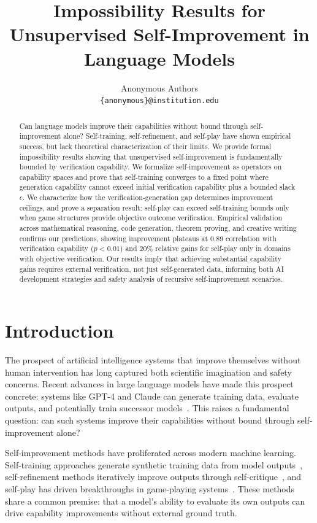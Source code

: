\documentclass{article}
\title{Impossibility Results for Unsupervised Self-Improvement in Language Models}
\author{Anonymous Authors \\
  \texttt{\{anonymous\}@institution.edu}
}
\theoremstyle{definition}
\theoremstyle{remark}
\begin{document}
\maketitle

\begin{abstract}
Can language models improve their capabilities without bound through self-improvement alone? Self-training, self-refinement, and self-play have shown empirical success, but lack theoretical characterization of their limits. We provide formal impossibility results showing that unsupervised self-improvement is fundamentally bounded by verification capability. We formalize self-improvement as operators on capability spaces and prove that self-training converges to a fixed point where generation capability cannot exceed initial verification capability plus a bounded slack \(\epsilon\). We characterize how the verification-generation gap determines improvement ceilings, and prove a separation result: self-play can exceed self-training bounds only when game structures provide objective outcome verification. Empirical validation across mathematical reasoning, code generation, theorem proving, and creative writing confirms our predictions, showing improvement plateaus at \(0.89\) correlation with verification capability (\(p < 0.01\)) and \(20\%\) relative gains for self-play only in domains with objective verification. Our results imply that achieving substantial capability gains requires external verification, not just self-generated data, informing both AI development strategies and safety analysis of recursive self-improvement scenarios.
\end{abstract}

\section{Introduction}
\label{sec:intro}

The prospect of artificial intelligence systems that improve themselves without human intervention has long captured both scientific imagination and safety concerns. Recent advances in large language models have made this prospect concrete: systems like GPT-4 and Claude can generate training data, evaluate outputs, and potentially train successor models~\cite{bubeck2023sparks}. This raises a fundamental question: can such systems improve their capabilities without bound through self-improvement alone?

Self-improvement methods have proliferated across modern machine learning. Self-training approaches generate synthetic training data from model outputs~\cite{zelikman2022star,gulcehre2023reinforced}, self-refinement methods iteratively improve outputs through self-critique~\cite{madaan2023selfrefine}, and self-play has driven breakthroughs in game-playing systems~\cite{silver2017mastering}. These methods share a common premise: that a model's ability to evaluate its own outputs can drive capability improvements without external ground truth.
\end{document}
